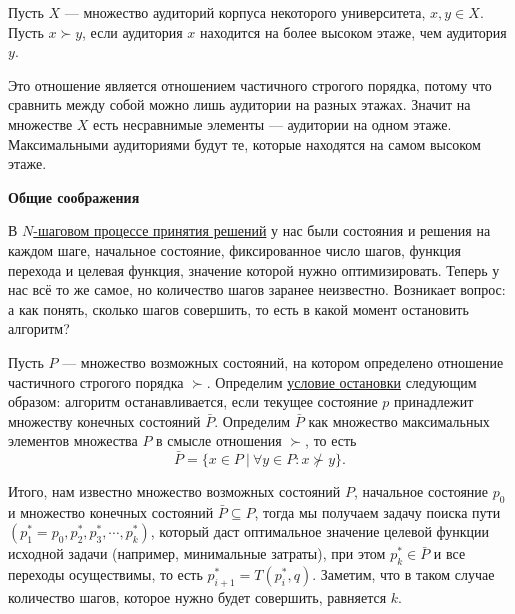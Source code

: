 \begin{figure}[H]
	\centering
\end{figure}

\example

Пусть $X$ --- множество аудиторий корпуса некоторого университета, $x, y \in X$. Пусть $\boxed{x \succ y}$, если аудитория $x$ находится на более высоком этаже, чем аудитория $y$.

Это отношение является отношением частичного строгого порядка, потому что сравнить между собой можно лишь аудитории на разных этажах. Значит на множестве $X$ есть несравнимые элементы --- аудитории на одном этаже. Максимальными аудиториями будут те, которые находятся на самом высоком этаже.

\label{alg:unknown_step_process}

\textbf{Общие соображения}

В \hyperref[alg:n_step_process]{$N$-шаговом процессе принятия решений} у нас были состояния и решения на каждом шаге, начальное состояние, фиксированное число шагов, функция перехода и целевая функция, значение которой нужно оптимизировать. Теперь у нас всё то же самое, но количество шагов заранее неизвестно. Возникает вопрос: а как понять, сколько шагов совершить, то есть в какой момент остановить алгоритм?

Пусть $P$ --- множество возможных состояний, на котором определено отношение частичного строгого порядка $\succ$. Определим \underline{условие остановки} следующим образом: алгоритм останавливается, если текущее состояние $p$ принадлежит множеству конечных состояний $\bar{P}$. Определим $\bar{P}$ как множество максимальных элементов множества $P$ в смысле отношения $\succ$, то есть
\[
\bar{P} = \big\{x \in P \ \big| \ \forall y \in P: x \nsucc y\big\}.
\]

Итого, нам известно множество возможных состояний $P$, начальное состояние $p_0$ и множество конечных состояний $\bar{P} \subseteq P$, тогда мы получаем задачу поиска пути $(p^*_1 = p_0, p^*_2, p^*_3, \cdots, p^*_k)$, который даст оптимальное значение целевой функции исходной задачи (например, минимальные затраты), при этом $p^*_k \in \bar{P}$ и все переходы осуществимы, то есть $p^*_{i+1} = T(p^*_{i}, q)$. Заметим, что в таком случае количество шагов, которое нужно будет совершить, равняется $k$.


